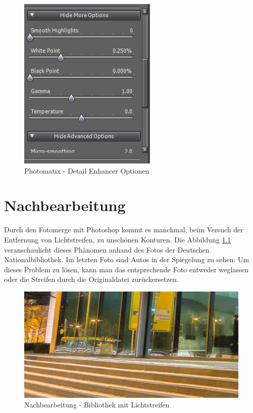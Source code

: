 \documentclass[liststotoc,bibtotoc,fontsize=14pt,]{scrreprt}
\begin{document}
		\bigskip
		\begin{figure}[H]
			\includegraphics[width=.5\linewidth]{img/photo6.jpg}
			\caption{Photomatix - Detail Enhancer Optionen}
			\label{img:photo6}
		\end{figure}
	
	\chapter{Nachbearbeitung}
	\label{ch:nach}
		Durch den Fotomerge mit Photoshop kommt es manchmal, beim Versuch der Entfernung von Lichtstreifen, zu unschönen Konturen. Die Abbildung \ref{img:bibo_normal} veranschaulicht dieses Phänomen anhand des Fotos der Deutschen Nationalbibliothek. Im letzten Foto sind Autos in der Spiegelung zu sehen. Um dieses Problem zu lösen, kann man das entsprechende Foto entweder weglassen oder die Streifen durch die Originaldatei zurückersetzen.
		\bigskip
		\begin{figure}[H]
			\includegraphics[width=\linewidth]{img/bibo_unbearbeitet.PNG}
			\caption{Nachbearbeitung - Bibliothek mit Lichtstreifen}
			\label{img:bibo_normal}
		\end{figure}
		
\end{document}
